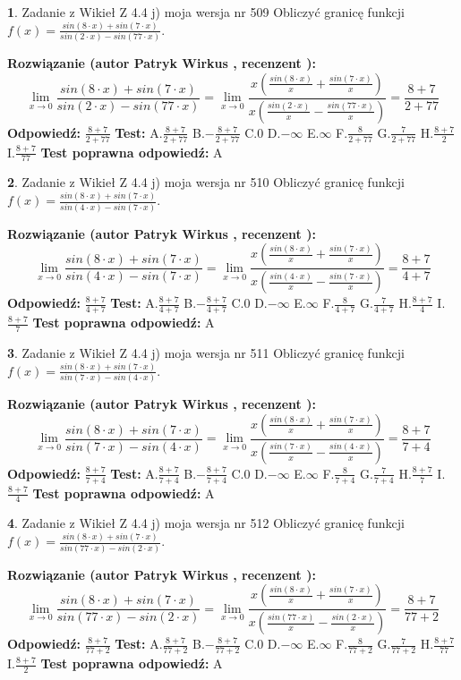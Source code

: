 \documentclass[12pt, a4paper]{article}
\theoremstyle{definition} %
\newtheorem{zad}{}
\newcommand{\zadStart}[1]{\begin{zad}#1\newline}
\newcommand{\zadStop}{\end{zad}}
\newcommand{\rozwStart}[2]{\noindent \textbf{Rozwiązanie (autor #1 , recenzent #2): }\newline}
\newcommand{\rozwStop}{\newline}
\newcommand{\odpStart}{\noindent \textbf{Odpowiedź:}\newline}
\newcommand{\odpStop}{\newline}
\newcommand{\testStart}{\noindent \textbf{Test:}\newline}
\newcommand{\testStop}{\newline}
\newcommand{\kluczStart}{\noindent \textbf{Test poprawna odpowiedź:}\newline}
\newcommand{\kluczStop}{\newline}
\begin{document}
\zadStart{Zadanie z Wikieł Z 4.4 j) moja wersja nr 509}
Obliczyć granicę funkcji $f(x)=\frac{sin(8\cdot x) +sin(7\cdot x)}{sin(2\cdot x) -sin(77\cdot x)}$.
\zadStop
\rozwStart{Patryk Wirkus}{}
$$\lim\limits_{x\to 0}\frac{sin(8\cdot x) +sin(7\cdot x)}{sin(2\cdot x) -sin(77\cdot x)}=\lim\limits_{x\to 0}\frac{x(\frac{sin(8\cdot x)}{x}+\frac{sin(7\cdot x)}{x})}{x(\frac{sin(2\cdot x)}{x}-\frac{sin(77\cdot x)}{x})}=\frac{8+7}{2+77}$$
\rozwStop
\odpStart
$\frac{8+7}{2+77}$
\odpStop
\testStart
A.$\frac{8+7}{2+77}$
B.$-\frac{8+7}{2+77}$
C.$0$
D.$-\infty$
E.$\infty$
F.$\frac{8}{2+77}$
G.$\frac{7}{2+77}$
H.$\frac{8+7}{2}$
I.$\frac{8+7}{77}$
\testStop
\kluczStart
A
\kluczStop



\zadStart{Zadanie z Wikieł Z 4.4 j) moja wersja nr 510}
Obliczyć granicę funkcji $f(x)=\frac{sin(8\cdot x) +sin(7\cdot x)}{sin(4\cdot x) -sin(7\cdot x)}$.
\zadStop
\rozwStart{Patryk Wirkus}{}
$$\lim\limits_{x\to 0}\frac{sin(8\cdot x) +sin(7\cdot x)}{sin(4\cdot x) -sin(7\cdot x)}=\lim\limits_{x\to 0}\frac{x(\frac{sin(8\cdot x)}{x}+\frac{sin(7\cdot x)}{x})}{x(\frac{sin(4\cdot x)}{x}-\frac{sin(7\cdot x)}{x})}=\frac{8+7}{4+7}$$
\rozwStop
\odpStart
$\frac{8+7}{4+7}$
\odpStop
\testStart
A.$\frac{8+7}{4+7}$
B.$-\frac{8+7}{4+7}$
C.$0$
D.$-\infty$
E.$\infty$
F.$\frac{8}{4+7}$
G.$\frac{7}{4+7}$
H.$\frac{8+7}{4}$
I.$\frac{8+7}{7}$
\testStop
\kluczStart
A
\kluczStop



\zadStart{Zadanie z Wikieł Z 4.4 j) moja wersja nr 511}
Obliczyć granicę funkcji $f(x)=\frac{sin(8\cdot x) +sin(7\cdot x)}{sin(7\cdot x) -sin(4\cdot x)}$.
\zadStop
\rozwStart{Patryk Wirkus}{}
$$\lim\limits_{x\to 0}\frac{sin(8\cdot x) +sin(7\cdot x)}{sin(7\cdot x) -sin(4\cdot x)}=\lim\limits_{x\to 0}\frac{x(\frac{sin(8\cdot x)}{x}+\frac{sin(7\cdot x)}{x})}{x(\frac{sin(7\cdot x)}{x}-\frac{sin(4\cdot x)}{x})}=\frac{8+7}{7+4}$$
\rozwStop
\odpStart
$\frac{8+7}{7+4}$
\odpStop
\testStart
A.$\frac{8+7}{7+4}$
B.$-\frac{8+7}{7+4}$
C.$0$
D.$-\infty$
E.$\infty$
F.$\frac{8}{7+4}$
G.$\frac{7}{7+4}$
H.$\frac{8+7}{7}$
I.$\frac{8+7}{4}$
\testStop
\kluczStart
A
\kluczStop



\zadStart{Zadanie z Wikieł Z 4.4 j) moja wersja nr 512}
Obliczyć granicę funkcji $f(x)=\frac{sin(8\cdot x) +sin(7\cdot x)}{sin(77\cdot x) -sin(2\cdot x)}$.
\zadStop
\rozwStart{Patryk Wirkus}{}
$$\lim\limits_{x\to 0}\frac{sin(8\cdot x) +sin(7\cdot x)}{sin(77\cdot x) -sin(2\cdot x)}=\lim\limits_{x\to 0}\frac{x(\frac{sin(8\cdot x)}{x}+\frac{sin(7\cdot x)}{x})}{x(\frac{sin(77\cdot x)}{x}-\frac{sin(2\cdot x)}{x})}=\frac{8+7}{77+2}$$
\rozwStop
\odpStart
$\frac{8+7}{77+2}$
\odpStop
\testStart
A.$\frac{8+7}{77+2}$
B.$-\frac{8+7}{77+2}$
C.$0$
D.$-\infty$
E.$\infty$
F.$\frac{8}{77+2}$
G.$\frac{7}{77+2}$
H.$\frac{8+7}{77}$
I.$\frac{8+7}{2}$
\testStop
\kluczStart
A
\kluczStop
\end{document}

